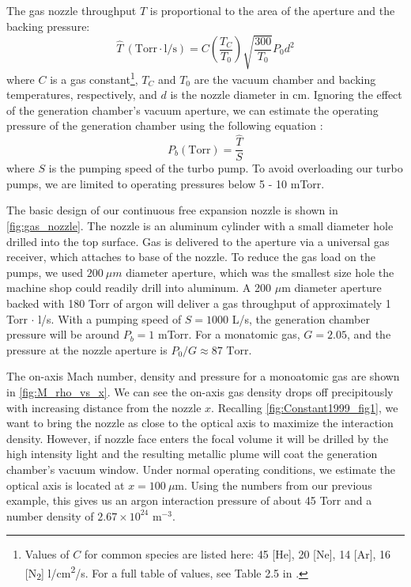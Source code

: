 The gas nozzle throughput $\hat{T}$ is proportional to the area of the aperture and the backing pressure:
\begin{equation}
\hat{T} \ (\text{Torr} \cdot \text{l}/\text{s}) = C \left(\frac{T_C}{T_0} \right)\sqrt{\frac{300}{T_0}} P_0 d^2
\label{eqn:nozzle_thruput}
\end{equation}
where $C$ is a gas constant\footnote{Values of $C$ for common species are listed here: 45 [He], 20 [Ne], 14 [Ar], 16 [N\textsubscript{2}] l/cm\textsuperscript{2}/s. For a full table of values, see Table 2.5 in \cite{millerFreeJetSources1988}.}, $T_C$ and $T_0$ are the vacuum chamber and backing temperatures, respectively, and $d$ is the nozzle diameter in cm. Ignoring the effect of the generation chamber's vacuum aperture, we can estimate the operating pressure of the generation chamber using the following equation \cite{hablanianHighvacuumTechnologyPractical1997}:
\begin{equation}
P_b (\text{Torr}) = \frac{\hat{T}}{S}
\end{equation}
where $S$ is the pumping speed of the turbo pump. To avoid overloading our turbo pumps, we are  limited to operating pressures below 5 - 10 mTorr.

The basic design of our continuous free expansion nozzle is shown in \cref{fig:gas_nozzle}. The nozzle is an aluminum cylinder with a small diameter hole drilled into the top surface. Gas is delivered to the aperture via a universal gas receiver, which attaches to base of the nozzle. To reduce the gas load on the pumps, we used $200 \ \mu m$ diameter aperture, which was the smallest size hole the machine shop could readily drill into aluminum. A 200 $\mu$m diameter aperture backed with 180 Torr of argon will deliver a gas throughput of approximately {1 Torr $\cdot$ l/s}. With a pumping speed of $S = 1000$ L/s, the generation chamber pressure will be around $P_b = 1$ mTorr. For a monatomic gas, $G = 2.05$, and the pressure at the nozzle aperture is $P_0/G \approx 87 \textrm{ Torr}$.

The on-axis Mach number, density and pressure for a monoatomic gas are shown in \cref{fig:M_rho_vs_x}. We can see the on-axis gas density drops off precipitously with increasing distance from the nozzle $x$. Recalling \cref{fig:Constant1999_fig1}, we want to bring the nozzle as close to the optical axis to maximize the interaction density. However, if nozzle face enters the focal volume it will be drilled by the high intensity light and the resulting metallic plume will coat the generation chamber's vacuum window. Under normal operating conditions, we estimate the optical axis is located at $x=100 \ \mu$m. Using the numbers from our previous example, this gives us an argon interaction pressure of about 45 Torr and a number density of $2.67 \times 10^{24} \textrm{ m}^{-3}$.

